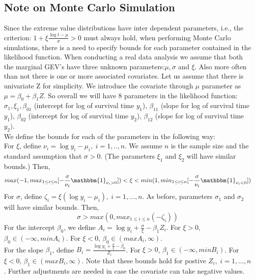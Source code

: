 \documentclass[11pt]{article}
\theoremstyle{remboldstyle}
\begin{document}
\subsection{Note on Monte Carlo Simulation}
\noindent
Since the extreme value distributions have inter dependent parameters, i.e., the criterion: $1 + \xi \frac{\log t - \mu}{\sigma} > 0$ must always hold, when performing Monte Carlo simulations, there is a need to specify bounds for each parameter contained in the likelihood function. When conducting a real data analysis we assume that both the marginal GEV's have three unknown parameters:$\mu, \sigma$ and $\xi$. Also more often than not there is one or more associated covariates. Let us assume that there is univariate Z for simplicity. We introduce the covariate through $\mu$ parameter as $\mu = \beta_0 + \beta_1Z$. So overall we will have 8 parameters in the likelihood function: $\sigma_1, \xi_1, \beta_{01}$ (intercept for log of survival time $y_1$), $\beta_{11}$ (slope for log of survival time $y_1$), $\beta_{02}$ (intercept for log of survival time $y_2$), $\beta_{12}$ (slope for log of survival time $y_2)$.\\
We define the bounds for each of the parameters in the following way:\\
For $\xi$, define $\nu_i = \log y_i - \mu_i, \; i = 1,.., n$. We assume $n$ is the sample size and the standard assumption that $\sigma > 0$. (The parameters $\xi_1$ and $\xi_2$ will have similar bounds.) Then,
\[
max(-1, max_{1 \le i \le n}[-\frac{\sigma}{\nu_i}\mathbbm{1}_{\nu_i > 0}]) < \xi < min(1, min_{1 \le i \le n}[-\frac{\sigma}{\nu_i}\mathbbm{1}_{\nu_i < 0}])
\]
For $\sigma$, define $\zeta_i = \xi (\log y_i - \mu_i), \; i = 1,..., n$. As before, parameters $\sigma_1$ and $\sigma_2$ will have similar bounds. Then,
\[
\sigma > max( 0, max_{1 \le i \le n}(-\zeta_i))
\]
For the intercept $\beta_0$, we define $A_i = \log y_i + \frac{\sigma}{\xi} - \beta_1 Z_i$. For $\xi > 0$, $\beta_0 \in (-\infty, min A_i)$. For $\xi < 0$, $\beta_0 \in (max A_i, \infty)$.\\
For the slope $\beta_1$, define $B_i = \frac{\log y_i + \frac{\sigma}{\xi} - \beta_0 }{Z_i}$. For $\xi > 0$, $\beta_1 \in (-\infty, min B_i)$. For $\xi < 0$, $\beta_1 \in (max B_i, \infty)$. Note that these bounds hold for postive $Z_i, \; i = 1,...,n$. Further adjustments are needed in case the covariate can take negative values. 
\end{document}
